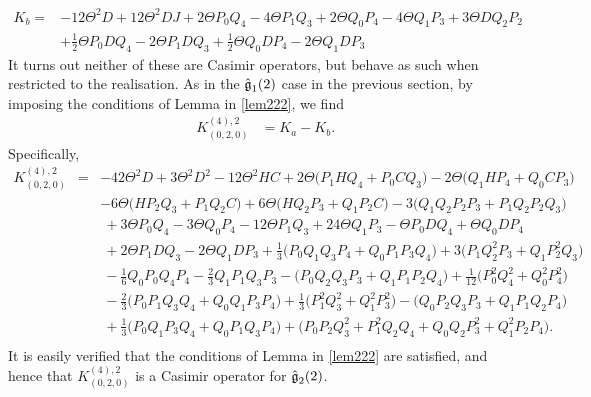 \documentclass[12pt]{article}
\begin{document}
\begin{align}
 K_b=&-12 \Theta ^2 D + 12 \Theta ^2 D J +2 \Theta   P_{0} Q_{4}-4 \Theta   P_{1} Q_{3}+ 2 \Theta   Q_{0} P_{4}-4 \Theta  Q_{1} P_{3} +3  \Theta D Q_{2} P_{2}
 \nonumber\\
& + \frac{1}{2}  \Theta  P_{0} D Q_{4}-2  \Theta  P_{1} D Q_{3}  + \frac{1}{2} \Theta   Q_{0}  D  P_{4}   - 2 \Theta  Q_{1}  D  P_{3} \nonumber 
\end{align}
It turns out neither of these are Casimir operators, but behave as such when
restricted to the realisation. As in the $\mathfrak{\Hat{g}}_{1}(2)$  case in the previous section, by imposing the conditions of Lemma in \ref{lem222}, we find
\begin{eqnarray*}
&K^{(4),2}_{(0,2,0)}&= K_a-K_b.
\end{eqnarray*}
Specifically,
\begin{eqnarray}
K^{(4),2}_{(0,2,0)}&=& -42 \Theta ^2 D +3 \Theta ^2 D^{2} -12 \Theta ^2 H C+2 \Theta  \big (P_{1}HQ_{4}+ P_{0}CQ_{3} \big) -2 \Theta  \big( Q_{1}HP_{4}+ Q_{0}CP_{3}\big) \nonumber\\
\ && - 6 \Theta  \big (H P_{2}Q_{3}+ P_{1}Q_{2}C\big)+6 \Theta  \big(H Q_{2}P_{3}+ Q_{1}P_{2}C\big)-3 \big( Q_{1} Q_{2} P_{2} P_{3}+ P_{1} Q_{2} P_{2} Q_{3} \big )\nonumber\\
&&\ +3  \Theta   P_{0} Q_{4}-3 \Theta   Q_{0} P_{4}-12 \Theta  P_{1} Q_{3}+24  \Theta  Q_{1} P_{3}- \Theta  P_{0} D Q_{4}+ \Theta   Q_{0}  D  P_{4} \nonumber\\
&&\ +2 \Theta   P_{1}  D  Q_{3}- 2 \Theta   Q_{1}  D  P_{3}+\frac{1}{3} \big ( P_{0}Q_{1}Q_{3}P_{4} +Q_{0}P_{1}P_{3}Q_{4} \big)+ 3 \big ( P_{1}Q^{2}_{2}P_{3} +Q_{1}P^{2}_{2}Q_{3} \big)\nonumber\\
&&\  - \frac{1}{6} Q_{0}P_{0}Q_{4}P_{4}-\frac{2}{3} Q_{1}P_{1}Q_{3}P_{3}- \big ( P_{0}Q_{2}Q_{3}P_{3} +Q_{1}P_{1}P_{2}Q_{4} \big)+\frac{1}{12} \big( P^{2}_{0} Q^{2}_{4}+ Q^{2}_{0} P^{2}_{4} \big) \nonumber\\
&&\ -\frac{2}{3} \big( P_{0} P_{1} Q_{3}  Q_{4}+  Q_{0} Q_{1} P_{3} P_{4} \big)+\frac{1}{3} \big( P^{2}_{1} Q^{2}_{3}+ Q^{2}_{1} P^{2}_{3} \big)- \big( Q_{0} P_{2}  Q_{3} P_{3} +Q_{1}  P_{1} Q_{2} P_{4}\big)\nonumber\\
&&\  +  \frac{1}{3} \big(  P_{0} Q_{1}  P_{3} Q_{4} +Q_{0}  P_{1} Q_{3} P_{4} \big)+  \big(P_{0} P_{2}  Q^{2}_{3}+P^{2}_{1}  Q_{2} Q_{4}
+ Q_{0} Q_{2} P^{2}_{3}  +Q^{2}_{1} P_{2} P_{4}\big).\nonumber\\ \label{exg2}
\end{eqnarray}
It is easily verified that the conditions of Lemma  in \ref{lem222} are
satisfied, and hence that $K^{(4),2}_{(0,2,0)}$ is a  Casimir operator for
$\mathfrak{\Hat{g}}_{2}(2)$.
\end{document}
